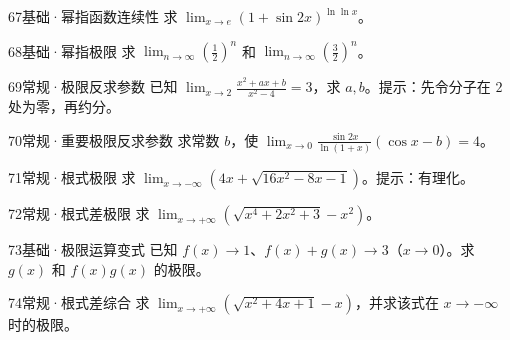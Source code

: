 \begin{exercise}{67}{基础·幂指函数连续性}
求 $\lim_{x\to e}(1+\sin2x)^{\ln\ln x}$。
\end{exercise}
\begin{exercise}{68}{基础·幂指极限}
求 $\lim_{n\to\infty}(\frac{1}{2})^n$ 和 $\lim_{n\to\infty}(\frac{3}{2})^n$。
\end{exercise}
\begin{exercise}{69}{常规·极限反求参数}
已知 $\lim_{x\to2}\frac{x^2+ax+b}{x^2-4}=3$，求 $a,b$。提示：先令分子在 $2$ 处为零，再约分。
\end{exercise}
\begin{exercise}{70}{常规·重要极限反求参数}
求常数 $b$，使 $\lim_{x\to0}\frac{\sin2x}{\ln(1+x)}(\cos x-b)=4$。
\end{exercise}
\begin{exercise}{71}{常规·根式极限}
求 $\lim_{x\to-\infty}(4x+\sqrt{16x^2-8x-1})$。提示：有理化。
\end{exercise}
\begin{exercise}{72}{常规·根式差极限}
求 $\lim_{x\to+\infty}(\sqrt{x^4+2x^2+3}-x^2)$。
\end{exercise}
\begin{exercise}{73}{基础·极限运算变式}
已知 $f(x)\to1$、$f(x)+g(x)\to3$（$x\to0$）。求 $g(x)$ 和 $f(x)g(x)$ 的极限。
\end{exercise}
\begin{exercise}{74}{常规·根式差综合}
求 $\lim_{x\to+\infty}(\sqrt{x^2+4x+1}-x)$，并求该式在 $x\to-\infty$ 时的极限。
\end{exercise}
